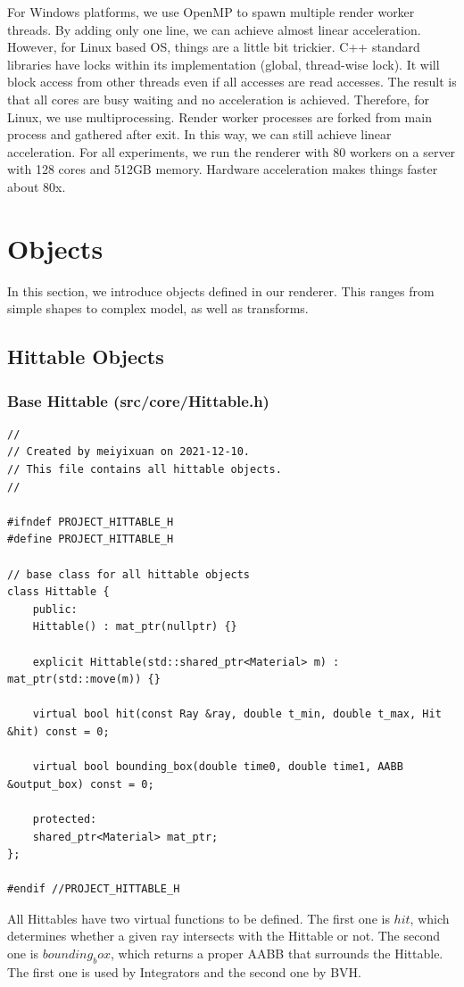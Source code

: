 \documentclass[utf8]{article}
\begin{document}
For Windows platforms, we use OpenMP to spawn multiple render worker threads. By adding only one line, we can achieve almost linear acceleration. However, for Linux based OS, things are a little bit trickier. C++ standard libraries have locks within its implementation (global, thread-wise lock). It will block access from other threads even if all accesses are read accesses. The result is that all cores are busy waiting and no acceleration is achieved. Therefore, for Linux, we use multiprocessing. Render worker processes are forked from main process and gathered after exit. In this way, we can still achieve linear acceleration. For all experiments, we run the renderer with 80 workers on a server with 128 cores and 512GB memory. Hardware acceleration makes things faster about 80x.

\section{Objects}
In this section, we introduce objects defined in our renderer. This ranges from simple shapes to complex model, as well as transforms.

\subsection{Hittable Objects}
\subsubsection{Base Hittable (src/core/Hittable.h)}
\begin{lstlisting}[style=CStyle]
//
// Created by meiyixuan on 2021-12-10.
// This file contains all hittable objects.
//

#ifndef PROJECT_HITTABLE_H
#define PROJECT_HITTABLE_H

// base class for all hittable objects
class Hittable {
	public:
	Hittable() : mat_ptr(nullptr) {}
	
	explicit Hittable(std::shared_ptr<Material> m) : mat_ptr(std::move(m)) {}
	
	virtual bool hit(const Ray &ray, double t_min, double t_max, Hit &hit) const = 0;
	
	virtual bool bounding_box(double time0, double time1, AABB &output_box) const = 0;
	
	protected:
	shared_ptr<Material> mat_ptr;
};

#endif //PROJECT_HITTABLE_H

\end{lstlisting}
All Hittables have two virtual functions to be defined. The first one is $hit$, which determines whether a given ray intersects with the Hittable or not. The second one is $bounding_box$, which returns a proper AABB that surrounds the Hittable. The first one is used by Integrators and the second one by BVH.
\end{document}
